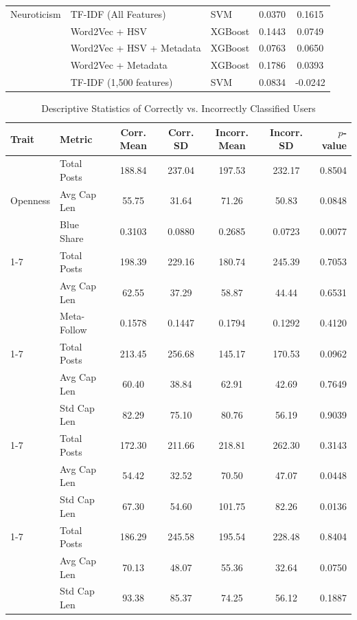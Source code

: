 \begin{table}[htbp]
{\begin{tabular}{l l l c c}
			\hline
			Neuroticism & TF-IDF (All Features) & SVM & 0.0370 & 0.1615 \\
			& Word2Vec + HSV & XGBoost & 0.1443 & 0.0749 \\
			& Word2Vec + HSV + Metadata & XGBoost & 0.0763 & 0.0650 \\
			& Word2Vec + Metadata & XGBoost & 0.1786 & 0.0393 \\
			& TF-IDF (1,500 features) & SVM & 0.0834 & -0.0242 \\
			
			\hline
		\end{tabular}%
	}
\end{table}

\begin{table}[htbp]
	\centering
	\caption{Descriptive Statistics of Correctly vs. Incorrectly Classified Users}
	\label{tab:descriptive_stats}
	\setlength{\tabcolsep}{4pt} %
	\small %
	\begin{tabular}{@{} l l c c c c r @{}}
		\toprule
		\textbf{Trait} & \textbf{Metric} & \textbf{Corr. Mean} & \textbf{Corr. SD} & \textbf{Incorr. Mean} & \textbf{Incorr. SD} & \textbf{$p$-value} \\
		\midrule
		\multirow{3}{*}{Openness} 
		& Total Posts & 188.84 & 237.04 & 197.53 & 232.17 & 0.8504 \\
		& Avg Cap Len & 55.75 & 31.64 & 71.26 & 50.83 & 0.0848 \\
		& Blue Share & 0.3103 & 0.0880 & 0.2685 & 0.0723 & 0.0077 \\
		\cmidrule(lr){1-7}
		\multirow{3}{*}{Conscien.} 
		& Total Posts & 198.39 & 229.16 & 180.74 & 245.39 & 0.7053 \\
		& Avg Cap Len & 62.55 & 37.29 & 58.87 & 44.44 & 0.6531 \\
		& Meta-Follow & 0.1578 & 0.1447 & 0.1794 & 0.1292 & 0.4120 \\
		\cmidrule(lr){1-7}
		\multirow{3}{*}{Extraver.} 
		& Total Posts & 213.45 & 256.68 & 145.17 & 170.53 & 0.0962 \\
		& Avg Cap Len & 60.40 & 38.84 & 62.91 & 42.69 & 0.7649 \\
		& Std Cap Len & 82.29 & 75.10 & 80.76 & 56.19 & 0.9039 \\
		\cmidrule(lr){1-7}
		\multirow{3}{*}{Agreeableness.} 
		& Total Posts & 172.30 & 211.66 & 218.81 & 262.30 & 0.3143 \\
		& Avg Cap Len & 54.42 & 32.52 & 70.50 & 47.07 & 0.0448 \\
		& Std Cap Len & 67.30 & 54.60 & 101.75 & 82.26 & 0.0136 \\
		\cmidrule(lr){1-7}
		\multirow{3}{*}{Neurotic.} 
		& Total Posts & 186.29 & 245.58 & 195.54 & 228.48 & 0.8404 \\
		& Avg Cap Len & 70.13 & 48.07 & 55.36 & 32.64 & 0.0750 \\
		& Std Cap Len & 93.38 & 85.37 & 74.25 & 56.12 & 0.1887 \\
		\bottomrule
	\end{tabular}
\end{table}

